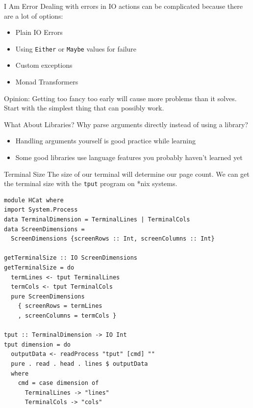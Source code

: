 \documentclass[10pt, presentation, colorlinks]{beamer}
\begin{document}
\begin{frame}[label={sec:org8975238},fragile]{I Am Error}
 Dealing with errors in IO actions can be complicated because there are a lot of options:

\bigskip
\pause

\begin{itemize}
\item Plain IO Errors
\item Using \texttt{Either} or \texttt{Maybe} values for failure
\item Custom exceptions
\item Monad Transformers
\end{itemize}

\bigskip
\pause

\alert{Opinion}: Getting too fancy too early will cause more problems than it solves. Start with the simplest thing that can possibly work.
\end{frame}

\begin{frame}[label={sec:orgd9efca8}]{What About Libraries?}
Why parse arguments directly instead of using a library?

\bigskip
\pause

\begin{itemize}
\item Handling arguments yourself is good practice while learning
\item Some good libraries use language features you probably haven't learned yet
\end{itemize}
\end{frame}

\begin{frame}[label={sec:org2990df5},fragile]{Terminal Size}
 The size of our terminal will determine our page count. We can get the terminal size with the \alert{\texttt{tput}} program on *nix systems.

\pause

\begin{verbatim}
module HCat where
import System.Process
data TerminalDimension = TerminalLines | TerminalCols
data ScreenDimensions =
  ScreenDimensions {screenRows :: Int, screenColumns :: Int}

getTerminalSize :: IO ScreenDimensions
getTerminalSize = do
  termLines <- tput TerminalLines
  termCols <- tput TerminalCols
  pure ScreenDimensions
    { screenRows = termLines
    , screenColumns = termCols }

tput :: TerminalDimension -> IO Int
tput dimension = do
  outputData <- readProcess "tput" [cmd] ""
  pure . read . head . lines $ outputData
  where
    cmd = case dimension of
      TerminalLines -> "lines"
      TerminalCols -> "cols"
\end{verbatim}
\end{frame}
\end{document}
